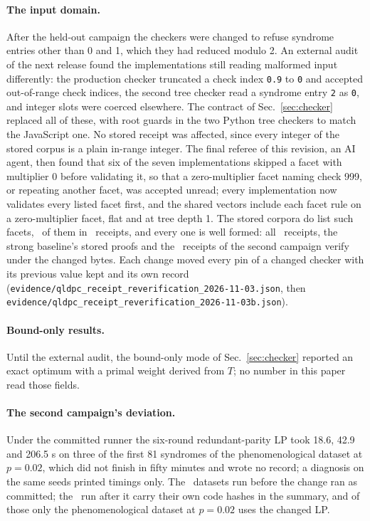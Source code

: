 \documentclass[aps,pra,twocolumn,superscriptaddress,nofootinbib,longbibliography,floatfix]{revtex4-2}
\begin{document}
\paragraph*{The input domain.} After the held-out campaign the checkers were changed to refuse syndrome entries other than 0 and 1, which they had reduced modulo 2. An external audit of the next release found the implementations still reading malformed input differently: the production checker truncated a check index \texttt{0.9} to \texttt{0} and accepted out-of-range check indices, the second tree checker read a syndrome entry \texttt{2} as \texttt{0}, and integer slots were coerced elsewhere. The contract of Sec.~\ref{sec:checker} replaced all of these, with root guards in the two Python tree checkers to match the JavaScript one. No stored receipt was affected, since every integer of the stored corpus is a plain in-range integer. The final referee of this revision, an AI agent, then found that six of the seven implementations skipped a facet with multiplier 0 before validating it, so that a zero-multiplier facet naming check 999, or repeating another facet, was accepted unread; every implementation now validates every listed facet first, and the shared vectors include each facet rule on a zero-multiplier facet, flat and at tree depth 1. The stored corpora do list such facets, \ZeroMultFacets\ of them in \ZeroMultReceipts\ receipts, and every one is well formed: all \ReplayReceipts\ receipts, the strong baseline's stored proofs and the \PrShots\ receipts of the second campaign verify under the changed bytes. Each change moved every pin of a changed checker with its previous value kept and its own record (\nolinkurl{evidence/qldpc_receipt_reverification_2026-11-03.json}, then \nolinkurl{evidence/qldpc_receipt_reverification_2026-11-03b.json}).

\paragraph*{Bound-only results.} Until the external audit, the bound-only mode of Sec.~\ref{sec:checker} reported an exact optimum with a primal weight derived from $T$; no number in this paper read those fields.

\paragraph*{The second campaign's deviation.} Under the committed runner the six-round redundant-parity LP took 18.6, 42.9 and 206.5 s on three of the first 81 syndromes of the phenomenological dataset at $p=0.02$, which did not finish in fifty minutes and wrote no record; a diagnosis on the same seeds printed timings only. The \PrCommittedDatasets\ datasets run before the change ran as committed; the \PrDeviatedDatasets\ run after it carry their own code hashes in the summary, and of those only the phenomenological dataset at $p=0.02$ uses the changed LP.
\end{document}
